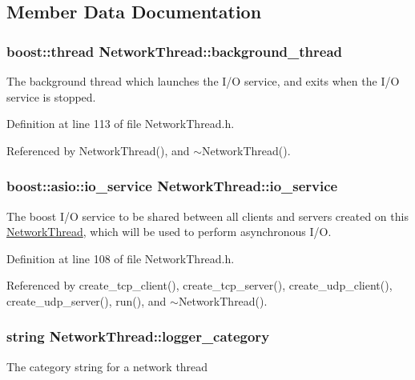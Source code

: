 \subsection{Member Data Documentation}
\hypertarget{classNetworkThread_ac9a925860e33ec1afb88a2b2f91e24c6}{
\subsubsection[{background\_\-thread}]{\setlength{\rightskip}{0pt plus 5cm}boost::thread {\bf NetworkThread::background\_\-thread}}}
\label{classNetworkThread_ac9a925860e33ec1afb88a2b2f91e24c6}
The background thread which launches the I/O service, and exits when the I/O service is stopped. 

Definition at line 113 of file NetworkThread.h.



Referenced by NetworkThread(), and $\sim$NetworkThread().

\hypertarget{classNetworkThread_a8dd2b75a9da06933cedfb086390fc522}{
\subsubsection[{io\_\-service}]{\setlength{\rightskip}{0pt plus 5cm}boost::asio::io\_\-service {\bf NetworkThread::io\_\-service}}}
\label{classNetworkThread_a8dd2b75a9da06933cedfb086390fc522}
The {\ttfamily boost} I/O service to be shared between all clients and servers created on this {\ttfamily \hyperlink{classNetworkThread}{NetworkThread}}, which will be used to perform asynchronous I/O. 

Definition at line 108 of file NetworkThread.h.



Referenced by create\_\-tcp\_\-client(), create\_\-tcp\_\-server(), create\_\-udp\_\-client(), create\_\-udp\_\-server(), run(), and $\sim$NetworkThread().

\hypertarget{classNetworkThread_a042e0a67fcd12363be06de1967410a61}{
\subsubsection[{logger\_\-category}]{\setlength{\rightskip}{0pt plus 5cm}string {\bf NetworkThread::logger\_\-category}}}
\label{classNetworkThread_a042e0a67fcd12363be06de1967410a61}
The category string for a network thread 


